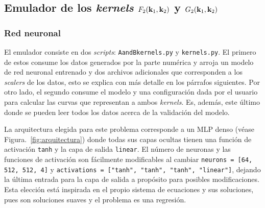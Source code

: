 \documentclass[letterpaper, 12pt]{article}
\begin{document}
        \subsection{\texorpdfstring{Emulador de los \emph{kernels} $F_2(\vb{k}_1, \vb{k}_2)$ y $G_2(\vb{k}_1, \vb{k}_2)$}{Emulador de los \emph{kernels} F2(k1, k2) y G2(k1, k2)}}
            \subsubsection{Red neuronal}
                 El emulador consiste en dos \emph{scripts}: \texttt{AandBkernels.py} y \texttt{kernels.py}. El primero de estos consume los datos generados por la parte numérica y arroja un modelo de red neuronal entrenado y dos archivos adicionales que corresponden a los \emph{scalers} de los datos, esto se explica con más detalle en los párrafos siguientes. Por otro lado, el segundo consume el modelo y una configuración dada por el usuario para calcular las curvas que representan a ambos \emph{kernels}. Es, además, este último donde se pueden leer todos los datos acerca de la validación del modelo.
    
                 La arquitectura elegida para este problema corresponde a un MLP denso (véase Figura.~\ref{fig:arquitectura}) donde todas sus capas ocultas tienen una función de activación \texttt{tanh} y la capa de salida \texttt{linear}. El número de neuronas y las funciones de activación son fácilmente modificables al cambiar \texttt{neurons = [64, 512, 512, 4]} y \texttt{activations = ["tanh", "tanh", "tanh", "linear"]}, dejando la última entrada para la capa de salida a propósito para posibles modificaciones. Esta elección está inspirada en el propio sistema de ecuaciones y sus soluciones, pues son soluciones suaves y el problema es una regresión.
    
\end{document}
